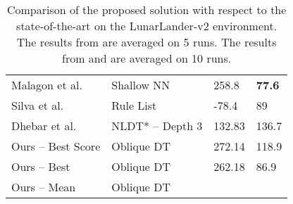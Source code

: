 \documentclass[review,english]{elsarticle}
\begin{document}
\begin{table}
{\begin{tabular}{|l|l|l|l|}
    Malagon et al.\cite{malagon_evolving_2019} &   Shallow NN &   258.8 & \textbf{77.6} \\
    Silva et al.\cite{silva_optimization_2020} &   Rule List &   -78.4 &   89 \\
    Dhebar et al.\cite{dhebar_interpretable-ai_2020} & NLDT* – Depth 3 &   132.83 &   136.7 \\ \hline
    Ours – Best Score & Oblique DT &   272.14 &   118.9 \\
    Ours – Best & Oblique DT  &   262.18 &   86.9 \\ 
    Ours – Mean & Oblique DT &  &  \\ \hline
    \end{tabular}
    }
\caption{Comparison of the proposed solution with respect to the state-of-the-art on the LunarLander-v2 environment.
The results from \cite{peng_advantage-weighted_2019} are averaged on 5 runs.
The results from \cite{xu_deep_2020} and \cite{malagon_evolving_2019} are averaged on 10 runs.
}
\label{tab:ll_sota_comparison}
\end{table}
\end{document}
